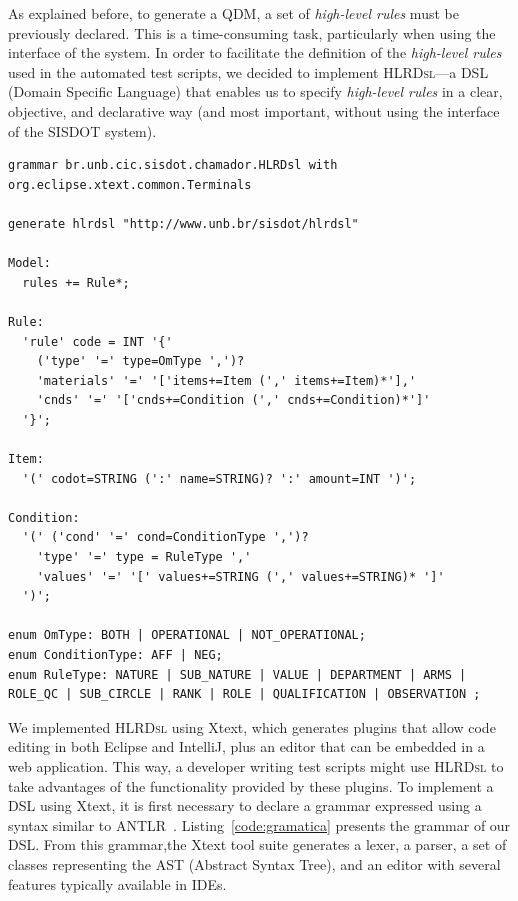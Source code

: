 \documentclass[twocolumn]{bmcart}%
\newcommand{\callers}{\emph{high-level rules}\xspace}
\newcommand{\hlrdsl}{\textsc{HLRDsl}\xspace}
\begin{document}
As explained before, to generate a QDM, a set of \callers must be previously declared. This is a time-consuming task, particularly when using the interface of the system. In order to facilitate the definition of the \callers used in the automated test scripts, we decided to implement \hlrdsl---a DSL (Domain Specific Language) that enables us to specify \callers in a clear, objective, and declarative way (and most important, without using the interface of the SISDOT system). 



\begin{lstlisting}[frame=single, float=*t, language=Xtext, caption={\it Xtext grammar defining the DSL structure}, label={code:gramatica}]
grammar br.unb.cic.sisdot.chamador.HLRDsl with org.eclipse.xtext.common.Terminals
        
generate hlrdsl "http://www.unb.br/sisdot/hlrdsl"

Model:
  rules += Rule*;

Rule:
  'rule' code = INT '{'
    ('type' '=' type=OmType ',')?
    'materials' '=' '['items+=Item (',' items+=Item)*'],'
    'cnds' '=' '['cnds+=Condition (',' cnds+=Condition)*']'
  '}';

Item: 
  '(' codot=STRING (':' name=STRING)? ':' amount=INT ')';

Condition:
  '(' ('cond' '=' cond=ConditionType ',')?
    'type' '=' type = RuleType ','
    'values' '=' '[' values+=STRING (',' values+=STRING)* ']'
  ')';

enum OmType: BOTH | OPERATIONAL | NOT_OPERATIONAL;
enum ConditionType: AFF | NEG;
enum RuleType: NATURE | SUB_NATURE | VALUE | DEPARTMENT | ARMS | ROLE_QC | SUB_CIRCLE | RANK | ROLE | QUALIFICATION | OBSERVATION ;
\end{lstlisting}

We implemented \hlrdsl  using Xtext, which generates plugins that allow code editing in both Eclipse and IntelliJ, plus an editor that can be embedded in a web application. This way, a developer writing test scripts might use \hlrdsl to take advantages of the functionality provided by these plugins. To implement a DSL using Xtext, it is first necessary to declare a grammar expressed using a syntax similar to ANTLR~\cite{parr2013}. Listing~\ref{code:gramatica} presents the grammar of our DSL. From this grammar,the Xtext tool suite generates a lexer, a parser, a set of classes representing the AST (Abstract Syntax Tree), and an editor with several features typically available in IDEs.
\end{document}
